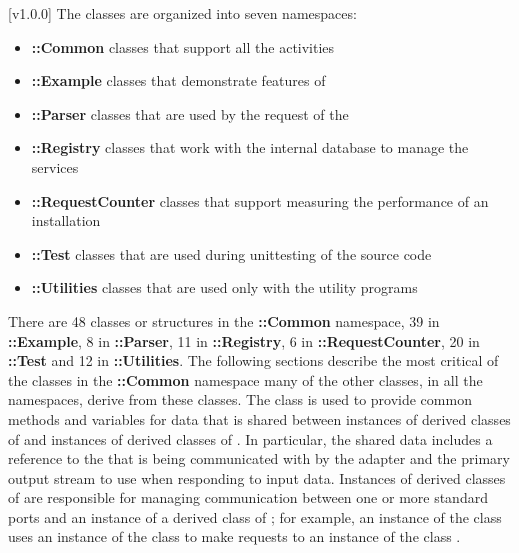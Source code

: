[v1.0.0]
The \mplusm{} classes are organized into seven namespaces:
\begin{itemize}
\item\textbf{\mplusm{}::Common} classes that support all the \mplusm{} activities
\item\exSp\textbf{\mplusm{}::Example} classes that demonstrate features of \mplusm{}
\item\exSp\textbf{\mplusm{}::Parser} classes that are used by the
 request of the
\item\exSp\textbf{\mplusm{}::Registry} classes that work with the internal database to
manage the \mplusm{} services
\item\exSp\textbf{\mplusm{}::RequestCounter} classes that support measuring the
performance of an \mplusm{} installation
\item\exSp\textbf{\mplusm{}::Test} classes that are used during unit\longDash{}testing of
the \mplusm{} source code
\item\exSp\textbf{\mplusm{}::Utilities} classes that are used only with the \mplusm{}
utility programs
\end{itemize}
There are 48 classes or structures in the \textbf{\mplusm{}::Common} namespace, 39 in
\textbf{\mplusm{}::Example}, 8 in \textbf{\mplusm{}::Parser}, 11 in
\textbf{\mplusm{}::Registry}, 6 in \textbf{\mplusm{}::RequestCounter}, 20 in
\textbf{\mplusm{}::Test} and 12 in \textbf{\mplusm{}::Utilities}.
The following sections describe the most critical of the classes in the
\textbf{\mplusm{}::Common} namespace \longDash{} many of the other classes, in all the
namespaces, derive from these classes. 
The class  is used to provide common methods and
variables for data that is shared between instances of derived classes of
 and instances of derived classes of
.
In particular, the shared data includes a reference to the 
that is being communicated with by the adapter and the primary output stream to use when
responding to input data.
Instances of derived classes of  are responsible
for managing \mplusm{} communication between one or more standard \yarp{} ports and an
instance of a derived class of ; for example, an instance
of the class  uses an instance of the class
 to make requests to an instance of the class
.\\

